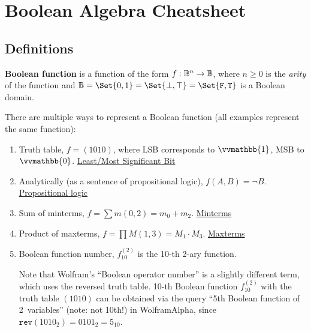 \documentclass[a4paper,10pt]{article}
\begin{document}

\setcounter{section}{2}%
\section{Boolean Algebra Cheatsheet}

\subsection{Definitions}

\begin{terms}
    \item \raggedright \textbf{Boolean function} is a function of the form $f: \mathbb{B}^{n} \to \mathbb{B}$, where $n \geq 0$ is the \emph{arity} of the function and $\Bool =\nobreak \Set{0, 1} =\nobreak \Set{\bot, \top} =\nobreak \Set{\texttt{F}, \texttt{T}}$ is a Boolean domain.

    \item There are multiple ways to represent a Boolean function (all examples represent the same function):

    \begin{enumerate}[left=6pt .. 18pt]
        \item Truth table, \eg $f = (1010)$, where LSB corresponds to $\vvmathbb{1}$, MSB to $\vvmathbb{0}$.
        \hfill\href{https://en.wikipedia.org/wiki/Bit_numbering}{Least/Most Significant Bit}

        \item Analytically (as a sentence of propositional logic), \eg $f(A,B) = \neg B$.
        \hfill\href{https://en.wikipedia.org/wiki/Propositional_logic}{Propositional logic}

        \item Sum of minterms, \eg $f = \sum m(0,2) = m_0 + m_2$.
        \hfill\href{http://www.cs.ucr.edu/~ehwang/courses/cs120a/minterms.pdf}{Minterms}

        \item Product of maxterms, \eg $f = \prod M(1,3) = M_1 \cdot M_3$.
        \hfill\href{http://www.cs.ucr.edu/~ehwang/courses/cs120a/minterms.pdf#page=2}{Maxterms}

        \item Boolean function number, \eg $f^{(2)}_{10}$ is the 10-th 2-ary function.

        Note that Wolfram's \enquote{Boolean operator number} is a slightly different term, which uses the reversed truth table.
        10-th Boolean function $f^{(2)}_{10}$ with the truth table $(1010)$ can be obtained via the query \enquote{5th Boolean function of 2~variables} (note: not 10th!) in WolframAlpha, since $\texttt{rev}(1010_2) = 0101_2 = 5_{10}$.
    \end{enumerate}

\end{terms}
\end{document}
